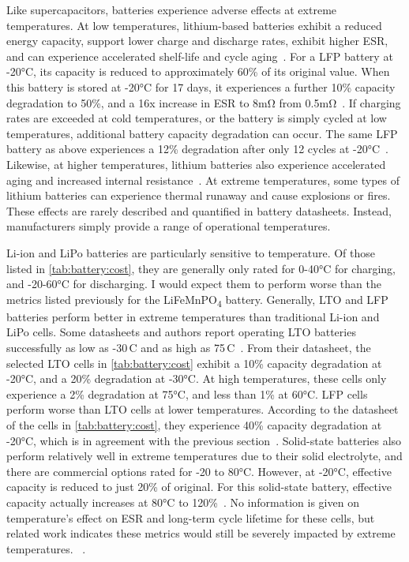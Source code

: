 Like supercapacitors, batteries experience adverse effects at extreme temperatures. At low temperatures, lithium-based batteries exhibit a reduced energy capacity, support lower charge and discharge rates, exhibit higher ESR, and can experience accelerated shelf-life and cycle aging~\cite{jaguemont2015lithium}. For a LFP battery at -20\si{\celsius}, its capacity is reduced to approximately 60\% of its original value. When this battery is stored at -20\si{\celsius} for 17 days, it experiences a further 10\% capacity degradation to 50\%, and a 16x increase in ESR to 8\si{\milli\ohm} from 0.5\si{\milli\ohm}~\cite{jaguemont2015lithium}.
If charging rates are exceeded at cold temperatures, or the battery is simply cycled at low temperatures, additional battery capacity degradation can occur. The same LFP battery as above experiences a 12\% degradation after only 12 cycles at -20\si{\celsius}~\cite{jaguemont2015lithium}.
Likewise, at higher temperatures, lithium batteries also experience accelerated aging and increased internal resistance~\cite{leng2015effect}. At extreme temperatures, some types of lithium batteries can experience thermal runaway and cause explosions or fires. These effects are rarely described and quantified in battery datasheets. Instead, manufacturers simply provide a range of operational temperatures.

Li-ion and LiPo batteries are particularly sensitive to temperature. Of those listed in \cref{tab:battery:cost}, they are generally only rated for 0-40\si{\celsius} for charging, and -20-60\si{\celsius} for discharging. I would expect them to perform worse than the metrics listed previously for the LiFeMnPO\textsubscript{4} battery.
Generally, LTO and LFP batteries perform better in extreme temperatures than traditional Li-ion and LiPo cells.
Some 
datasheets and authors report operating LTO batteries successfully as low as -30\,\textdegree C
and as high as 75\,\textdegree C~\cite{LTODatasheet2, lifepo4Datasheet, chenEvaluation15}. From their datasheet, the selected LTO cells in \cref{tab:battery:cost} exhibit a 10\% capacity degradation at -20\si{\celsius}, and a 20\% degradation at -30\si{\celsius}. At high temperatures, these cells only experience a 2\% degradation at 75\si{\celsius}, and less than 1\% at 60\si{\celsius}. LFP cells perform worse than LTO cells at lower temperatures. According to the datasheet of the cells in \cref{tab:battery:cost}, they experience 40\% capacity degradation at -20\si{\celsius}, which is in agreement with the previous section~\cite{lifepo4Datasheet, jaguemont2015lithium}. Solid-state batteries also perform relatively well in extreme temperatures due to their solid electrolyte, and there are commercial options rated for -20 to 80\si{\celsius}. However, at -20\si{\celsius}, effective capacity is reduced to just 20\% of original. For this solid-state battery, effective capacity actually increases at 80\si{\celsius} to 120\%~\cite{tdkCeraCharge}.
No information is given on temperature's effect on ESR and long-term cycle lifetime for these cells, but related work indicates these metrics would still be severely impacted by extreme temperatures.
~\cite{wangCycle11, swierczynskiInvestigation14}.

